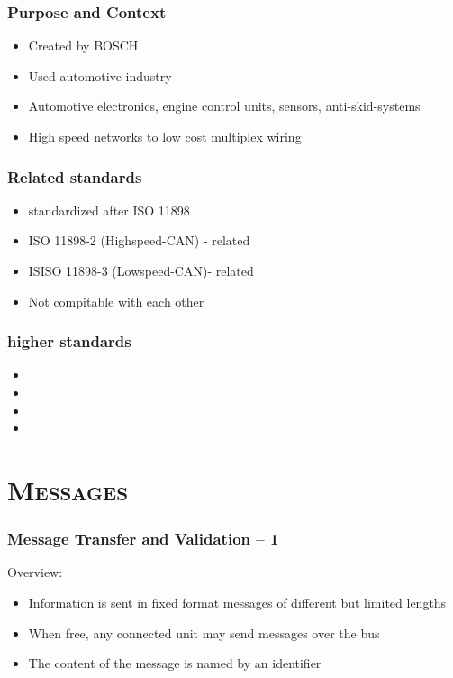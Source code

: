 \documentclass[xcolor=x11names,compress]{beamer}
\renewcommand{\(}{\begin{columns}}
\renewcommand{\)}{\end{columns}}
\newcommand{\<}[1]{\begin{column}{#1}}
\renewcommand{\>}{\end{column}}
\begin{document}
\begin{frame}
  \frametitle{Purpose and Context }
  \begin{itemize}
      \item Created by BOSCH
      \item Used automotive industry 
      \item Automotive electronics, engine control units, sensors, anti-skid-systems
      \item High speed networks to low cost multiplex wiring
  \end{itemize}

\end{frame}

\begin{frame}
  \frametitle{Related standards}
  \begin{itemize}
      \item standardized after ISO 11898
      \item ISO 11898-2 (Highspeed-CAN) - related
      \item ISISO 11898-3 (Lowspeed-CAN)- related      
      \item Not compitable with each other
  \end{itemize}

\end{frame}

\begin{frame}
  \frametitle{higher standards}
  \begin{itemize}
      \item 
      \item 
      \item     
      \item 
  \end{itemize}

\end{frame}

\section{\scshape Messages}
\begin{frame}
  \frametitle{Message Transfer and Validation -- 1}
  Overview:
  \begin{itemize}
    \item Information is sent in fixed format messages of different but limited lengths
    \item When free, any connected unit may send messages over the bus
    \item The content of the message is named by an identifier
  \end{itemize}

\end{frame}
\end{document}
